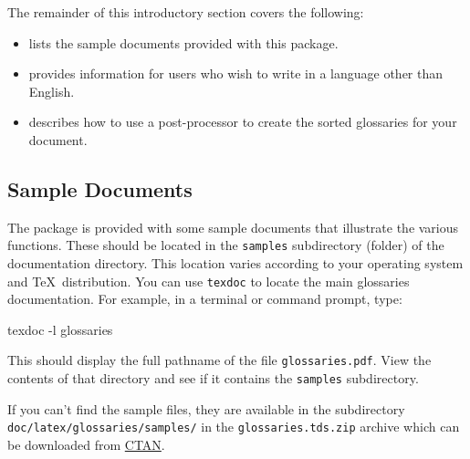 \documentclass{nlctdoc}
\begin{document}
The remainder of this introductory section covers the following:
\begin{itemize}
\item {} lists the sample documents provided 
with this package.

\item {} provides information for users who
wish to write in a language other than English.

\item {} describes how to use a
post-processor to create the sorted glossaries for your document.

\end{itemize}


\subsection{Sample Documents}
\label{sec:samples}

The  package is provided with some sample
documents that illustrate the various functions. These should
be located in the \texttt{samples} subdirectory (folder) of the
 documentation directory. This location varies
according to your operating system and \TeX\ distribution. You
can use \texttt{texdoc} to locate the main glossaries documentation.
For example, in a terminal or command prompt, type:
\begin{prompt}
texdoc -l glossaries
\end{prompt}
This should display the full pathname of the file 
\texttt{glossaries.pdf}. View the contents of that directory and
see if it contains the \texttt{samples} subdirectory.

If you can't find the sample files, they are available in the
subdirectory \texttt{doc/latex/glossaries/samples/} in the
\texttt{glossaries.tds.zip} archive which can be downloaded from
\href{http://tug.ctan.org/tex-archive/macros/latex/contrib/glossaries/}{CTAN}.
\end{document}
